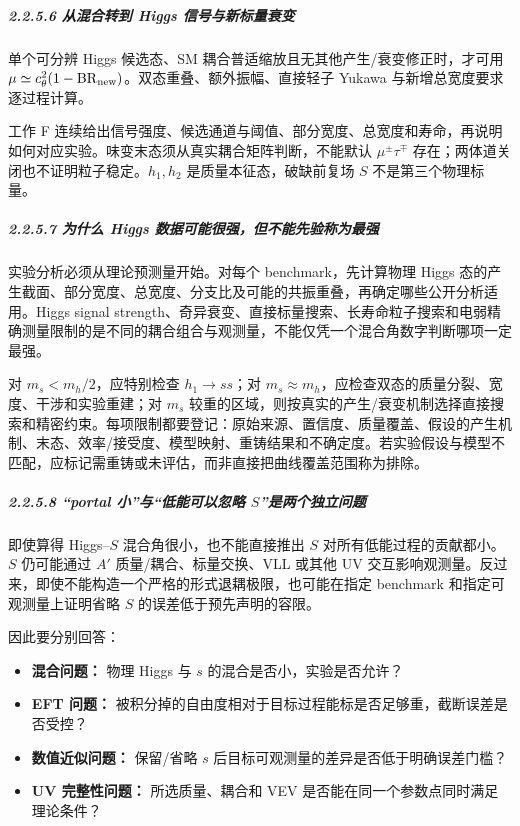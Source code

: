 \documentclass[
]{article}
\providecommand{\tightlist}{%
  \setlength{\itemsep}{0pt}\setlength{\parskip}{0pt}}
\begin{document}
\subparagraph{2.2.5.6 从混合转到 Higgs
信号与新标量衰变}\label{ux4eceux6df7ux5408ux8f6cux5230-higgs-ux4fe1ux53f7ux4e0eux65b0ux6807ux91cfux8870ux53d8}

单个可分辨 Higgs 候选态、SM 耦合普适缩放且无其他产生/衰变修正时，才可用
\(\mu\simeq c_\theta^2(1-\mathrm{BR}_{\rm new})\)。双态重叠、额外振幅、直接轻子
Yukawa 与新增总宽度要求逐过程计算。

工作 F
连续给出信号强度、候选通道与阈值、部分宽度、总宽度和寿命，再说明如何对应实验。味变末态须从真实耦合矩阵判断，不能默认
\(\mu^\pm\tau^\mp\) 存在；两体道关闭也不证明粒子稳定。\(h_1,h_2\)
是质量本征态，破缺前复场 \(S\) 不是第三个物理标量。

\subparagraph{2.2.5.7 为什么 Higgs
数据可能很强，但不能先验称为最强}\label{ux4e3aux4ec0ux4e48-higgs-ux6570ux636eux53efux80fdux5f88ux5f3aux4f46ux4e0dux80fdux5148ux9a8cux79f0ux4e3aux6700ux5f3a}

实验分析必须从理论预测量开始。对每个 benchmark，先计算物理 Higgs
态的产生截面、部分宽度、总宽度、分支比及可能的共振重叠，再确定哪些公开分析适用。Higgs
signal
strength、奇异衰变、直接标量搜索、长寿命粒子搜索和电弱精确测量限制的是不同的耦合组合与观测量，不能仅凭一个混合角数字判断哪项一定最强。

对 \(m_s<m_h/2\)，应特别检查 \(h_1\to ss\)；对
\(m_s\approx m_h\)，应检查双态的质量分裂、宽度、干涉和实验重建；对
\(m_s\)
较重的区域，则按真实的产生/衰变机制选择直接搜索和精密约束。每项限制都要登记：原始来源、置信度、质量覆盖、假设的产生机制、末态、效率/接受度、模型映射、重铸结果和不确定度。若实验假设与模型不匹配，应标记需重铸或未评估，而非直接把曲线覆盖范围称为排除。

\subparagraph{\texorpdfstring{2.2.5.8 ``portal 小''与``低能可以忽略
\(S\)''是两个独立问题}{2.2.5.8 ``portal 小''与``低能可以忽略 S''是两个独立问题}}\label{portal-ux5c0fux4e0eux4f4eux80fdux53efux4ee5ux5ffdux7565-sux662fux4e24ux4e2aux72ecux7acbux95eeux9898}

即使算得 Higgs--\(S\) 混合角很小，也不能直接推出 \(S\)
对所有低能过程的贡献都小。\(S\) 仍可能通过 \(A'\)
质量/耦合、标量交换、VLL 或其他 UV
交互影响观测量。反过来，即使不能构造一个严格的形式退耦极限，也可能在指定
benchmark 和指定可观测量上证明省略 \(S\) 的误差低于预先声明的容限。

因此要分别回答：

\begin{itemize}
\tightlist
\item
  \textbf{混合问题：} 物理 Higgs 与 \(s\) 的混合是否小，实验是否允许？
\item
  \textbf{EFT 问题：}
  被积分掉的自由度相对于目标过程能标是否足够重，截断误差是否受控？
\item
  \textbf{数值近似问题：} 保留/省略 \(s\)
  后目标可观测量的差异是否低于明确误差门槛？
\item
  \textbf{UV 完整性问题：} 所选质量、耦合和 VEV
  是否能在同一个参数点同时满足理论条件？
\end{itemize}
\end{document}

